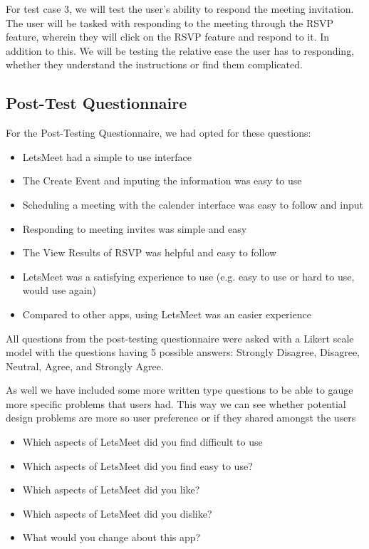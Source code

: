 \documentclass{sigchi}
\begin{document}
For test case 3, we will test the user's ability to respond the meeting invitation. The user will be tasked with responding to the meeting through the RSVP feature, wherein they will click on the RSVP feature and respond to it. In addition to this. We will be testing the relative ease the user has to responding, whether they understand the instructions or find them complicated.

\subsection{Post-Test Questionnaire}

For the Post-Testing Questionnaire, we had opted for these questions:
\begin{itemize}
	\item LetsMeet had a simple to use interface
	\item The Create Event and inputing the information was easy to use
	\item Scheduling a meeting with the calender interface was easy to follow and input
	\item Responding to meeting invites was simple and easy
	\item The View Results of RSVP was helpful and easy to follow
	\item LetsMeet was a satisfying experience to use (e.g. easy to use or hard to use, would use again)
	\item Compared to other apps, using LetsMeet was an easier experience
\end{itemize}

All questions from the post-testing questionnaire were asked with a Likert scale model with the questions having 5 possible answers: Strongly Disagree, Disagree, Neutral, Agree, and Strongly Agree.

As well we have included some more written type questions to be able to gauge more specific problems that users had. This way we can see whether potential design problems are more so user preference or if they shared amongst the users
\begin{itemize}
	\item Which aspects of LetsMeet did you find difficult to use
	\item Which aspects of LetsMeet did you find easy to use?
	\item Which aspects of LetsMeet did you like?
	\item Which aspects of LetsMeet did you dislike?
	\item What would you change about this app?
\end{itemize}
\end{document}
